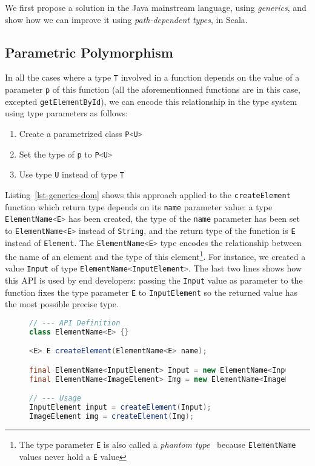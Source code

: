 \documentclass{llncs}
\newcommand{\jscode}[1]{\lstinline[language=JavaScript]|#1|}
\newcommand{\scalacode}[1]{\lstinline[language=Scala]|#1|}
\begin{document}
We first propose a solution in the Java mainstream language, using \emph{generics}, and show how we can improve it using \emph{path-dependent types}, in Scala.

\subsection{Parametric Polymorphism}

In all the cases where a type \scalacode{T} involved in a function depends on the value of a parameter \scalacode{p} of this function (all the aforementionned functions are in this case, excepted \jscode{getElementById}), we can encode this relationship in the type system using type parameters as follows:

\begin{enumerate}
 \item Create a parametrized class \scalacode{P<U>}
 \item Set the type of \scalacode{p} to \scalacode{P<U>}
 \item Use type \scalacode{U} instead of type \scalacode{T}
\end{enumerate}

Listing~\ref{lst-generics-dom} shows this approach applied to the \jscode{createElement} function which return type depends on its \jscode{name} parameter value: a type \scalacode{ElementName<E>} has been created, the type of the \scalacode{name} parameter has been set to \scalacode{ElementName<E>} instead of \scalacode{String}, and the return type of the function is \scalacode{E} instead of \scalacode{Element}. The \scalacode{ElementName<E>} type encodes the relationship between the name of an element and the type of this element\footnote{The type parameter \scalacode{E} is also called a \emph{phantom type}~\cite{leijen1999domain} because \scalacode{ElementName} values never hold a \scalacode{E} value}. For instance, we created a value \scalacode{Input} of type \scalacode{ElementName<InputElement>}. The last two lines shows how this API is used by end developers: passing the \scalacode{Input} value as parameter to the function fixes the type parameter \scalacode{E} to \scalacode{InputElement} so the returned value has the most possible precise type.

\begin{figure}
\begin{lstlisting}[label=lst-generics-dom,language=java,caption={Encoding of the \jscode{createElement} function using type parameters}]
// --- API Definition
class ElementName<E> {}

<E> E createElement(ElementName<E> name);

final ElementName<InputElement> Input = new ElementName<InputElement>();
final ElementName<ImageElement> Img = new ElementName<ImageElement>();

// --- Usage
InputElement input = createElement(Input);
ImageElement img = createElement(Img);
\end{lstlisting}
\end{figure}
\end{document}
